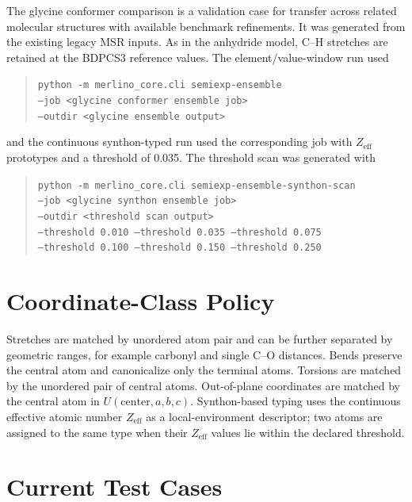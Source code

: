 \documentclass[journal=jpclcd,manuscript=letter,etalmode=truncate,chaptertitle=true]{achemso}
\begin{document}
The glycine conformer comparison is a validation case for transfer across related molecular structures with available benchmark refinements.  It was generated from the existing legacy MSR inputs.  As in the anhydride model, C--H stretches are retained at the BDPCS3 reference values.  The element/value-window run used
\begin{quote}
\small
\texttt{python -m merlino\_core.cli semiexp-ensemble}\\
\texttt{--job <glycine conformer ensemble job>}\\
\texttt{--outdir <glycine ensemble output>}
\end{quote}
and the continuous synthon-typed run used the corresponding job with $Z_\mathrm{eff}$ prototypes and a threshold of 0.035.
The threshold scan was generated with
\begin{quote}
\small
\texttt{python -m merlino\_core.cli semiexp-ensemble-synthon-scan}\\
\texttt{--job <glycine synthon ensemble job>}\\
\texttt{--outdir <threshold scan output>}\\
\texttt{--threshold 0.010 --threshold 0.035 --threshold 0.075}\\
\texttt{--threshold 0.100 --threshold 0.150 --threshold 0.250}
\end{quote}

\section*{Coordinate-Class Policy}

Stretches are matched by unordered atom pair and can be further separated by geometric ranges, for example carbonyl and single C--O distances.  Bends preserve the central atom and canonicalize only the terminal atoms.  Torsions are matched by the unordered pair of central atoms.  Out-of-plane coordinates are matched by the central atom in $U(\mathrm{center},a,b,c)$.  Synthon-based typing uses the continuous effective atomic number $Z_\mathrm{eff}$ as a local-environment descriptor; two atoms are assigned to the same type when their $Z_\mathrm{eff}$ values lie within the declared threshold.

\section*{Current Test Cases}
\end{document}
